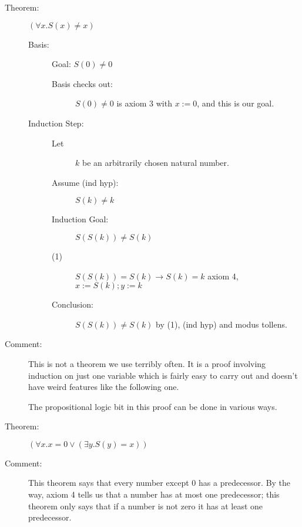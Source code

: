 \documentclass[12pt]{article}
\begin{document}
\begin{description}

\item[Theorem:] $(\forall x.S(x) \neq x)$

\begin{description}

\item[Basis:]  Goal:  $S(0) \neq 0$

\begin{description}

\item[Basis checks out:] $S(0) \neq 0$ is axiom 3 with $x := 0$, and
this is our goal.

\end{description}

\item[Induction Step:]

\begin{description}

\item[Let]  $k$ be an arbitrarily chosen natural number.

\item[Assume (ind hyp):]  $S(k) \neq k$

\item[Induction Goal:]  $S(S(k)) \neq S(k)$

\item[(1)] $S(S(k)) = S(k) \rightarrow S(k) = k$  axiom 4, $x:=S(k); y:=k$

\item[Conclusion:] $S(S(k)) \neq S(k)$ by (1), (ind hyp) and modus tollens.

\end{description}

\end{description}

\item[Comment:]  This is not a theorem we use terribly often.  It is a proof
involving induction on just one variable which is fairly easy to carry out and
doesn't have weird features like the following one.

The propositional logic bit in this proof can be done in various ways.

\item[Theorem:]  $(\forall x.x=0 \vee (\exists y.S(y)=x))$

\item[Comment:] This theorem says that every number except 0 has a
predecessor.  By the way, axiom 4 tells us that a number has at most
one predecessor; this theorem only says that if a number is not zero
it has at least one predecessor.


\end{description}
\end{document}
